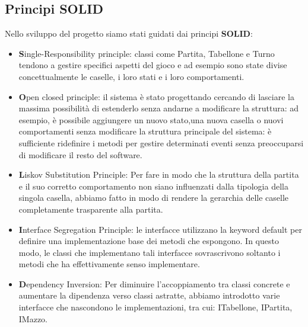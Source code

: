 \documentclass{article}
\begin{document}
\subsection{Principi SOLID}
Nello sviluppo del progetto siamo stati guidati dai principi \textbf{SOLID}:
\begin{itemize}
    \item \textbf{S}ingle-Responsibility principle: classi come Partita, Tabellone e Turno tendono a gestire specifici aspetti del gioco e ad esempio sono state divise concettualmente le caselle, i loro stati e i loro comportamenti.
    
    \item \textbf{O}pen closed principle: il sistema è stato progettando cercando di lasciare la massima possibilità di estenderlo senza andarne a modificare la struttura: ad esempio, è possibile aggiungere un nuovo stato,una nuova casella o nuovi comportamenti senza modificare la struttura principale del sistema: è sufficiente ridefinire i metodi per gestire determinati eventi senza preoccuparsi di modificare il resto del software.
    
    \item \textbf{L}iskov Substitution Principle: Per fare in modo che la struttura della partita e il suo corretto comportamento non siano influenzati dalla tipologia della singola casella, abbiamo fatto in modo di rendere la gerarchia delle caselle completamente trasparente alla partita.
    
    \item \textbf{I}nterface Segregation Principle: le interfacce utilizzano la keyword default per definire una implementazione base dei metodi che espongono. In questo modo, le classi che implementano tali interfacce sovrascrivono soltanto i metodi che ha effettivamente senso implementare.
    
    \item \textbf{D}ependency Inversion: Per diminuire l'accoppiamento tra classi concrete e aumentare la dipendenza verso classi astratte, abbiamo introdotto varie interfacce che nascondono le implementazioni, tra cui: ITabellone, IPartita, IMazzo.
    \end{itemize}
\end{document}
